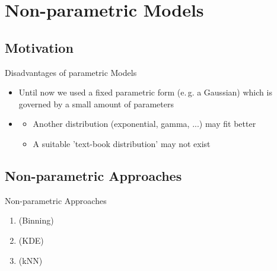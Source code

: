 \section{Non-parametric Models}

\subsection{Motivation}

\begin{frame}{Disadvantages of parametric Models}{}\important
	\begin{itemize}
		\item Until now we used a fixed parametric form (e.\,g. a Gaussian) which is governed by a small amount of parameters
		\item {}
		\begin{itemize}
			\item Another distribution (exponential, gamma, ...) may fit better
			\item A suitable 'text-book distribution' may not exist
		\end{itemize}
	\end{itemize}
	
	\vspace*{2mm}
	\begin{boxBlueNoFrame}
	\end{boxBlueNoFrame}
\end{frame}


\subsection{Non-parametric Approaches}

\begin{frame}{Non-parametric Approaches}{}
	\begin{enumerate}
		\item {} (Binning)
		\item {} (KDE)
		\item {} (kNN)
	\end{enumerate}
\end{frame}


